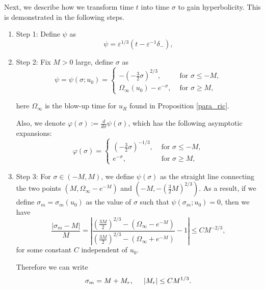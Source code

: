 \documentclass[letterpaper,11pt]{article}
\newcommand{\eps}{\varepsilon}
\numberwithin{equation}{section}
\theoremstyle{plain}
\begin{document}
Next, we describe how we transform time $t$ into time $\sigma$ to gain hyperbolicity. This is demonstrated in the following steps.
\begin{enumerate}
\item Step 1: Define $\psi$ as
\[
\psi = \eps^{1/3}(t - \eps^{-1}\delta_-),
\]

\item Step 2:
Fix $M>0$ large, define $\sigma$ as
\begin{equation} \label{psi_def}
\psi = \psi(\sigma; u_0) =\begin{cases}
-(-\frac{3}{2} \sigma)^{2/3} , &\text{ for }\sigma \le -M, \\
\Omega_\infty(u_0) -e^{-\sigma}, &\text{ for }\sigma \ge M,
\end{cases}
\end{equation}

here $\Omega_\infty$ is the blow-up time for $u_R$ found in Proposition \ref{para_ric}.

Also, we denote $\varphi(\sigma) := \frac{d}{d\sigma}\psi(\sigma)$, which has the following asymptotic expansions: 
\begin{equation} \label{phi_def}
\varphi(\sigma)  =\begin{cases}
(-\frac{3}{2} \sigma)^{-1/3} , &\text{ for }\sigma \le -M, \\
e^{-\sigma}, &\text{ for }\sigma \ge M,
\end{cases}
\end{equation}
\item Step 3: For $\sigma \in (-M, M)$, we define $\psi(\sigma)$ as the straight line connecting the two points $(M, \Omega_\infty-e^{-M})$ and $(-M, -(\frac{3}{2}M)^{2/3})$. As a result, if we define $\sigma_m=\sigma_m(u_0)$ as the value of $\sigma$ such that $\psi(\sigma_m; u_0) = 0$, then we have 
\[
\frac{|\sigma_m - M|}{M} = \left| \frac{(\frac{3M}{2})^{2/3}-(\Omega_\infty-e^{-M})}{(\frac{3M}{2})^{2/3}-(\Omega_\infty+e^{-M})} -1 \right|\le CM^{-2/3},
\] 
for some constant $C$ independent of $u_0$.

Therefore we can write
\begin{equation}\label{sigm_asy}
\sigma_m = M + M_r, \hspace{0.2in} |M_r| \le CM^{1/3}.
\end{equation}
\end{enumerate}
\end{document}
